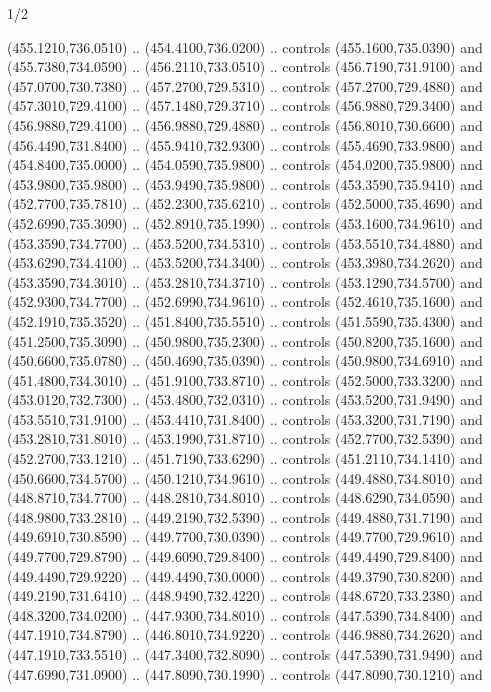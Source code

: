 \begin{flagdescription}{1/2}
\begin{scope}[xshift=0.5\flaglength]
\begin{scope}[scale=0.00745\flagwidth,xshift=-12.1mm,yshift=41.7mm]
\begin{scope}[y=0.80pt, x=0.80pt, yscale=-1, xscale=1, inner sep=0pt, outer sep=0pt]
\begin{scope}[cm={{1.33333,0.0,0.0,-1.33333,(0.0,114.66667)}}]
\begin{scope}[scale=0.100]
  (455.1210,736.0510) .. (454.4100,736.0200) .. controls (455.1600,735.0390) and
  (455.7380,734.0590) .. (456.2110,733.0510) .. controls (456.7190,731.9100) and
  (457.0700,730.7380) .. (457.2700,729.5310) .. controls (457.2700,729.4880) and
  (457.3010,729.4100) .. (457.1480,729.3710) .. controls (456.9880,729.3400) and
  (456.9880,729.4100) .. (456.9880,729.4880) .. controls (456.8010,730.6600) and
  (456.4490,731.8400) .. (455.9410,732.9300) .. controls (455.4690,733.9800) and
  (454.8400,735.0000) .. (454.0590,735.9800) .. controls (454.0200,735.9800) and
  (453.9800,735.9800) .. (453.9490,735.9800) .. controls (453.3590,735.9410) and
  (452.7700,735.7810) .. (452.2300,735.6210) .. controls (452.5000,735.4690) and
  (452.6990,735.3090) .. (452.8910,735.1990) .. controls (453.1600,734.9610) and
  (453.3590,734.7700) .. (453.5200,734.5310) .. controls (453.5510,734.4880) and
  (453.6290,734.4100) .. (453.5200,734.3400) .. controls (453.3980,734.2620) and
  (453.3590,734.3010) .. (453.2810,734.3710) .. controls (453.1290,734.5700) and
  (452.9300,734.7700) .. (452.6990,734.9610) .. controls (452.4610,735.1600) and
  (452.1910,735.3520) .. (451.8400,735.5510) .. controls (451.5590,735.4300) and
  (451.2500,735.3090) .. (450.9800,735.2300) .. controls (450.8200,735.1600) and
  (450.6600,735.0780) .. (450.4690,735.0390) .. controls (450.9800,734.6910) and
  (451.4800,734.3010) .. (451.9100,733.8710) .. controls (452.5000,733.3200) and
  (453.0120,732.7300) .. (453.4800,732.0310) .. controls (453.5200,731.9490) and
  (453.5510,731.9100) .. (453.4410,731.8400) .. controls (453.3200,731.7190) and
  (453.2810,731.8010) .. (453.1990,731.8710) .. controls (452.7700,732.5390) and
  (452.2700,733.1210) .. (451.7190,733.6290) .. controls (451.2110,734.1410) and
  (450.6600,734.5700) .. (450.1210,734.9610) .. controls (449.4880,734.8010) and
  (448.8710,734.7700) .. (448.2810,734.8010) .. controls (448.6290,734.0590) and
  (448.9800,733.2810) .. (449.2190,732.5390) .. controls (449.4880,731.7190) and
  (449.6910,730.8590) .. (449.7700,730.0390) .. controls (449.7700,729.9610) and
  (449.7700,729.8790) .. (449.6090,729.8400) .. controls (449.4490,729.8400) and
  (449.4490,729.9220) .. (449.4490,730.0000) .. controls (449.3790,730.8200) and
  (449.2190,731.6410) .. (448.9490,732.4220) .. controls (448.6720,733.2380) and
  (448.3200,734.0200) .. (447.9300,734.8010) .. controls (447.5390,734.8400) and
  (447.1910,734.8790) .. (446.8010,734.9220) .. controls (446.9880,734.2620) and
  (447.1910,733.5510) .. (447.3400,732.8090) .. controls (447.5390,731.9490) and
  (447.6990,731.0900) .. (447.8090,730.1990) .. controls (447.8090,730.1210) and

\end{scope}
\end{scope}
\end{scope}
\end{scope}
\end{scope}
\end{flagdescription}
